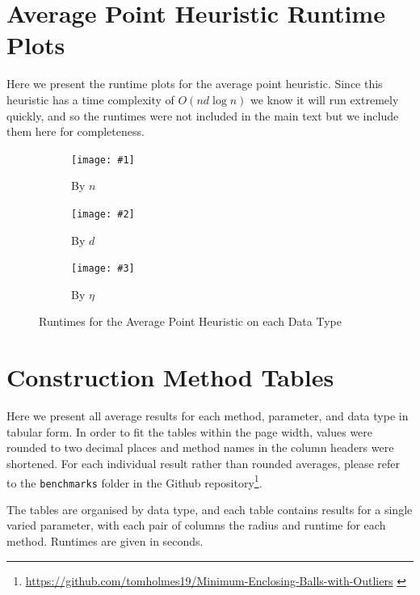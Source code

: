 \documentclass[11pt,twoside]{report}
\newcommand{\benchmarkfigure}[5]{
    \begin{figure}[ht]
        \centering
        \begin{subfigure}[b]{0.475\textwidth}
            \centering
            \texttt{[image: \#1]}
            \caption{By $n$}
            \label{#5_n}
        \end{subfigure}
        \hfill
        \begin{subfigure}[b]{0.475\textwidth}
            \centering
            \texttt{[image: \#2]}
            \caption{By $d$}
            \label{#5_d}
        \end{subfigure}
        
        \begin{subfigure}[b]{0.475\textwidth}
            \centering
            \texttt{[image: \#3]}
            \caption{By $\eta$}
            \label{#5_eta}
        \end{subfigure}
        \caption{#4}
        \label{#5}
    \end{figure}
}
\newcommand{\benchmarkfigurebyfunc}[3]{
    \benchmarkfigure{alg_benchmarks/by_func/#1_func_n_d30_eta0p9.png}{alg_benchmarks/by_func/#1_func_d_n10000_eta0p9.png}{alg_benchmarks/by_func/#1_func_eta_n10000_d30.png}{#2}{#3}
}
\theoremstyle{definition}
\numberwithin{theorem}{section}
\numberwithin{definition}{section}
\numberwithin{lemma}{section}
\numberwithin{proposition}{section}
\numberwithin{equation}{section}
\numberwithin{figure}{section}
\begin{document}
\begin{appendices}
    \section{Average Point Heuristic Runtime Plots}
    Here we present the runtime plots for the average point heuristic. Since this heuristic has a time complexity of $O(nd\log n)$ we know it will run extremely quickly, and so the runtimes were not included in the main text but we include them here for completeness.
    
    \benchmarkfigurebyfunc{shrink_avg}{Runtimes for the Average Point Heuristic on each Data Type}{fig:aph_benchmarks}
    
    \clearpage
    
    \section{Construction Method Tables}\label{app:constr_tables}
    Here we present all average results for each method, parameter, and data type in tabular form. In order to fit the tables within the page width, values were rounded to two decimal places and method names in the column headers were shortened. For each individual result rather than rounded averages, please refer to the \texttt{benchmarks} folder in the Github repository\footnote{\url{https://github.com/tomholmes19/Minimum-Enclosing-Balls-with-Outliers} \cite{Holmes_Minimum_Enclosing_Balls_2021}}.
    
    The tables are organised by data type, and each table contains results for a single varied parameter, with each pair of columns the radius and runtime for each method. Runtimes are given in seconds.
    

\end{appendices}
\end{document}
